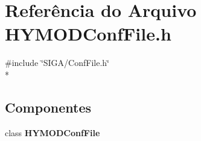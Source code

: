 \section{Referência do Arquivo H\+Y\+M\+O\+D\+Conf\+File.\+h}
\label{_h_y_m_o_d_conf_file_8h}
{\ttfamily \#include \char`\"{}S\+I\+G\+A/\+Conf\+File.\+h\char`\"{}}\\*
\subsection*{Componentes}
\begin{DoxyCompactItemize}
\item 
class {\bf H\+Y\+M\+O\+D\+Conf\+File}
\end{DoxyCompactItemize}
